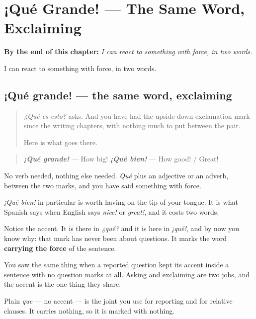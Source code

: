 
\chapter{¡Qué Grande! --- The Same Word, Exclaiming}
\label{ch:que-grande}

\begin{chapteropening}
\textbf{By the end of this chapter:} \emph{I can react to something with force, in two words.}

I can react to something with force, in two words.
\end{chapteropening}

\section[¡Qué grande!]{¡Qué grande! — the same word, exclaiming}

\label{lesson:ES-C64-que-grande}



\begin{quote}
\emph{¿Qué es esto?} asks. And you have had the upside-down exclamation mark since the writing chapters, with nothing much to put between the pair.

Here is what goes there.
\end{quote}

\begin{grammarlens}[title={Grammar Lens: qué in front of an adjective}]
\begin{quote}
\emph{\textbf{¡Qué grande!}} — How big! \emph{\textbf{¡Qué bien!}} — How good! / Great!
\end{quote}

No verb needed, nothing else needed. \emph{Qué} plus an adjective or an adverb, between the two marks, and you have said something with force.

\emph{¡Qué bien!} in particular is worth having on the tip of your tongue. It is what Spanish says when English says \emph{nice!} or \emph{great!}, and it costs two words.
\end{grammarlens}

\begin{culture}
Notice the accent. It is there in \emph{¿qué?} and it is here in \emph{¡qué!}, and by now you know why: that mark has never been about questions. It marks the word \textbf{carrying the force} of the sentence.

You saw the same thing when a reported question kept its accent inside a sentence with no question marks at all. Asking and exclaiming are two jobs, and the accent is the one thing they share.

Plain \emph{que} — no accent — is the joint you use for reporting and for relative clauses. It carries nothing, so it is marked with nothing.
\end{culture}

